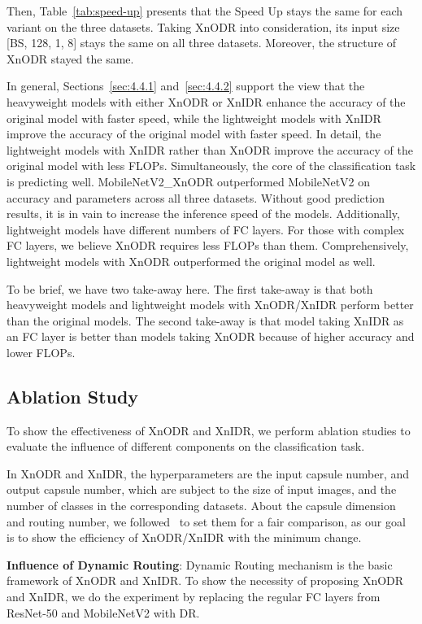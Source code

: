 \documentclass[sn-mathphys,iicol,Numbered]{sn-jnl}
\begin{document}
Then, Table~\ref{tab:speed-up} presents that the Speed Up stays the same for each variant on the three datasets. Taking XnODR into consideration, its input size [BS, 128, 1, 8] stays the same on all three datasets. Moreover, the structure of XnODR stayed the same. 

In general, Sections~\ref{sec:4.4.1} and~\ref{sec:4.4.2} support the view that the heavyweight models with either XnODR or XnIDR enhance the accuracy of the original model with faster speed, while the lightweight models with XnIDR improve the accuracy of the original model with faster speed. In detail, the lightweight models with XnIDR rather than XnODR improve the accuracy of the original model with less FLOPs. Simultaneously, the core of the classification task is predicting well. MobileNetV2\_XnODR outperformed MobileNetV2 on accuracy and parameters across all three datasets. Without good prediction results, it is in vain to increase the inference speed of the models. Additionally, lightweight models have different numbers of FC layers. For those with complex FC layers, we believe XnODR requires less FLOPs than them. Comprehensively, lightweight models with XnODR outperformed the original model as well.

To be brief, we have two take-away here. The first take-away is that both heavyweight models and lightweight models with XnODR/XnIDR perform better than the original models. The second take-away is that model taking XnIDR as an FC layer is better than models taking XnODR because of higher accuracy and lower FLOPs.

\subsection{Ablation Study} \label{sec:4.5}

To show the effectiveness of XnODR and XnIDR, we perform ablation studies to evaluate the influence of different components on the classification task. 

In XnODR and XnIDR, the hyperparameters are the input capsule number, and output capsule number, which are subject to the size of input images, and the number of classes in the corresponding datasets. About the capsule dimension and routing number, we followed~\cite{A1_caps} to set them for a fair comparison, as our goal is to show the efficiency of XnODR/XnIDR with the minimum change.

\textbf{Influence of Dynamic Routing}: Dynamic Routing mechanism is the basic framework of XnODR and XnIDR. To show the necessity of proposing XnODR and XnIDR, we do the experiment by replacing the regular FC layers from ResNet-50 and MobileNetV2 with DR.
\end{document}
